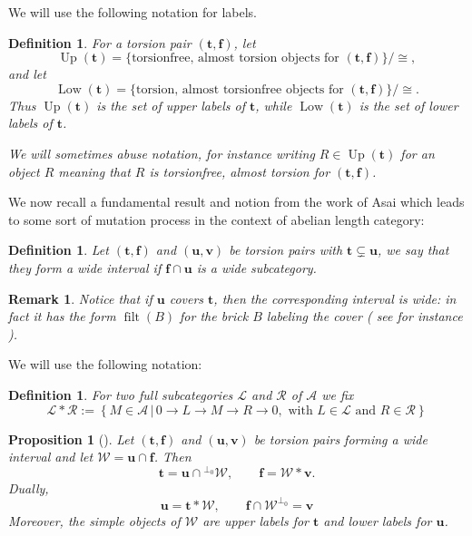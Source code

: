 \documentclass[10pt,a4paper]{amsart}
\newtheorem{proposition}[theorem]{Proposition}
\newtheorem{definition}[theorem]{Definition}
\newtheorem{remark}[theorem]{Remark}
\newcommand{\A}{\mathcal A}
\newcommand{\filt}{\operatorname{filt}}
\newcommand{\Up}{\operatorname{Up}}
\newcommand{\Low}{\operatorname{Low}}
\newcommand{\tpair}[2]{(\mathbf{#1}, \mathbf{#2})  }
\begin{document}
We will use the following notation for labels.

\begin{definition}
For a torsion pair \((\mathbf t,\mathbf f)\), let
\[
\Up(\mathbf t)=\{\text{torsionfree, almost torsion objects for }(\mathbf t,\mathbf f)\}/\cong,
\]
and let
\[
\Low(\mathbf t)=\{\text{torsion, almost torsionfree objects for }(\mathbf t,\mathbf f)\}/\cong.
\]
Thus \(\Up(\mathbf t)\) is the set of upper labels of \(\mathbf t\), while \(\Low(\mathbf t)\) is the set of lower labels of \(\mathbf t\).

We will sometimes abuse notation, for instance writing $ R \in \Up(\mathbf{t}) $ for an object \( R \) meaning that \( R \) is torsionfree, almost torsion for \( \tpair{t}{f} \).
\end{definition}

We now recall a fundamental result and notion from the work of Asai which leads to some sort of mutation process in the context of abelian length category:

\begin{definition}
Let \((\mathbf t,\mathbf f)\) and \((\mathbf u,\mathbf v)\) be torsion pairs with \( \mathbf{t} \subsetneq \mathbf{u} \), we say that they form a \emph{wide interval} if \( \mathbf{f} \cap \mathbf{u} \) is a wide subcategory.
\end{definition}

\begin{remark}
Notice that if \( \mathbf{u} \) covers \( \mathbf{t} \), then the corresponding interval is wide: in fact it has the form \( \filt(B) \) for the brick \( B \) labeling the cover ( see for instance \cite[Theorem 3.3]{DIRRT} ).
\end{remark}

We will use the following notation:

\begin{definition}
For two full subcategories \( \mathcal{L} \) and \( \mathcal{R} \) of \( \A \) we fix
\[
\mathcal{L} * \mathcal{R} := \left\{ M \in \A \,|\,  0 \to L \to M \to R \to 0, \text{ with }L \in \mathcal{L}\text{ and }R \in \mathcal{R} \right\}
\]
\end{definition}

\begin{proposition}[{\cite[Theorem 4.2, Proposition 6.3]{AsaiPfeifer}}]\label{prop:cover-intersection}
Let \((\mathbf t,\mathbf f)\) and \((\mathbf u,\mathbf v)\) be torsion pairs forming a wide interval and let \( \mathcal{W} = \mathbf{u} \cap \mathbf{f} \). Then
\[
\mathbf{t} = \mathbf{u} \cap {}^{\perp_0} \mathcal{W},
\qquad
\mathbf f=\mathcal{W}*\mathbf v.
\]
Dually, 
\[
\mathbf {u} = \mathbf{t} * \mathcal{W}, \qquad \mathbf{f} \cap \mathcal{W}^{\perp_0} = \mathbf{v}
\]
Moreover, the simple objects of \( \mathcal{W} \) are upper labels for \( \mathbf{t} \) and lower labels for \( \mathbf{u} \).
\end{proposition}
\end{document}
